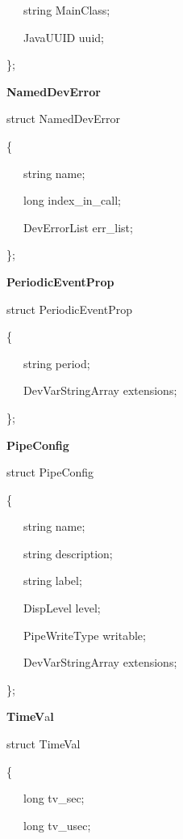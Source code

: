 ~~~string MainClass;

~~~JavaUUID uuid;

\};\\


\begin{flushleft}
\textbf{NamedDevError}
\par\end{flushleft}

struct NamedDevError

\{

~~~string name;

~~~long index\_in\_call;

~~~DevErrorList err\_list;

\};\\


\begin{flushleft}
\textbf{PeriodicEventProp}
\par\end{flushleft}

struct PeriodicEventProp

\{

~~~string period;

~~~DevVarStringArray extensions;

\};\\


\begin{flushleft}
\textbf{PipeConfig}
\par\end{flushleft}

struct PipeConfig

\{

~~~string name;

~~~string description;

~~~string label;

~~~DispLevel level;

~~~PipeWriteType writable;

~~~DevVarStringArray extensions;

\};\\


\begin{flushleft}
\textbf{TimeV}a\textbf{l}
\par\end{flushleft}

struct TimeVal

\{

~~~long tv\_sec;

~~~long tv\_usec;

